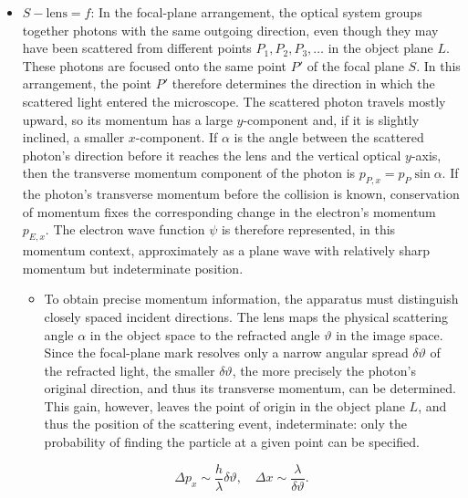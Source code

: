 \documentclass[pdflatex]{sn-jnl}
\newcommand{\pos}{\ensuremath{x}\xspace}
\newcommand{\mom}{\ensuremath{p_x}\xspace}
\providecommand{\DIFdelbegin}{} %
\providecommand{\DIFdelend}{} %
\begin{document}
\begin{itemize}
\begin{equation*}
\Delta \pos \sim \frac{\lambda}{\sin\epsilon}, \quad \Delta \mom \sim \frac{h}{\lambda}\sin\epsilon.
\end{equation*}

\item $S-\text{lens}=f$: In the focal-plane arrangement, the optical system groups together photons with the same outgoing direction, even though they may have been scattered from different points $P_1,P_2,P_3,\ldots$ in the object plane $L$. These photons are focused onto the same point $P'$ of the focal plane $S$. In this arrangement, the point $P'$ therefore determines the direction in which the scattered light entered the microscope. The scattered photon travels mostly upward, so its momentum has a large $y$-component and, if it is slightly inclined, a smaller $x$-component. If $\alpha$ is the angle between the scattered photon's direction before it reaches the lens and the vertical optical $y$-axis, then the transverse momentum component of the photon is $p_{P,x}=p_P\sin\alpha$. If the photon's transverse momentum before the collision is known, conservation of momentum fixes the corresponding change in the electron's momentum $p_{E,x}$. The electron wave function $\psi$ is therefore represented, in this momentum context, approximately as a plane wave with relatively sharp momentum but indeterminate position.

\begin{itemize}
\item To obtain precise momentum information, the apparatus must distinguish closely spaced incident directions. The lens maps the physical scattering angle $\alpha$ in the object space to the refracted angle $\vartheta$ in the image space. Since the focal-plane mark resolves only a narrow angular spread $\delta\vartheta$ of the refracted light, the smaller $\delta\vartheta$, the more precisely the photon's original direction, and thus its transverse momentum, can be determined. This gain, however, leaves the point of origin in the object plane $L$, and thus the position of the scattering event, indeterminate: only the probability of finding the particle at a given point can be specified.
\end{itemize}


\DIFdelbegin %

\DIFdelend \begin{equation*}
\Delta \mom \sim \frac{h}{\lambda}\delta\vartheta, \quad \Delta \pos \sim \frac{\lambda}{\delta\vartheta}.
\end{equation*}
\end{itemize}
\end{document}
